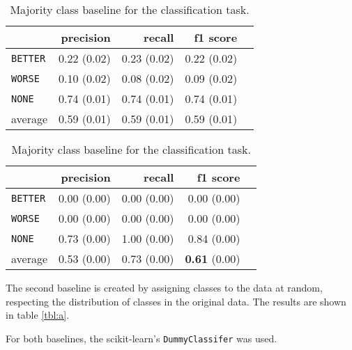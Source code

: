 \begin{table}[!htb]
    \begin{minipage}{.5\linewidth}
      \caption{Random (stratified) baseline for the classification task.}
      \label{foo}
      \centering
      
\begin{tabular}{@{}lrrrr@{}}
\toprule
 	&	 precision &	 recall &	 f1 score  \\ \midrule 
\texttt{BETTER}	&	 0.22 \scriptsize{(0.02)} &	 0.23 \scriptsize{(0.02)} &	 0.22 \scriptsize{(0.02)}  \\ 
\texttt{WORSE}	&	 0.10 \scriptsize{(0.02)} &	 0.08 \scriptsize{(0.02)} &	 0.09 \scriptsize{(0.02)}  \\ 
\texttt{NONE}	&	 0.74 \scriptsize{(0.01)} &	 0.74 \scriptsize{(0.01)} &	 0.74 \scriptsize{(0.01)}  \\ 
average	&	 0.59 \scriptsize{(0.01)} &	 0.59 \scriptsize{(0.01)} &	 0.59 \scriptsize{(0.01)}  \\ 
\bottomrule
\end{tabular} 

  \end{minipage}%
    \begin{minipage}{.5\linewidth}
      \centering
        \caption{Majority class baseline for the classification task.}
\begin{tabular}{@{}lrrrr@{}}
\toprule
 	&	 precision &	 recall &	 f1 score  \\ \midrule 
\texttt{BETTER}	&	 0.00 \scriptsize{(0.00)} &	 0.00 \scriptsize{(0.00)} &	 0.00 \scriptsize{(0.00)}  \\ 
\texttt{WORSE}	&	 0.00 \scriptsize{(0.00)} &	 0.00 \scriptsize{(0.00)} &	 0.00 \scriptsize{(0.00)}  \\ 
\texttt{NONE}	&	 0.73 \scriptsize{(0.00)} &	 1.00 \scriptsize{(0.00)} &	 0.84 \scriptsize{(0.00)}  \\ 
average	&	 0.53 \scriptsize{(0.00)} &	 0.73 \scriptsize{(0.00)} &	 \textbf{0.61} \scriptsize{(0.00)}  \\ 
\bottomrule
\end{tabular}
    \end{minipage} 
\end{table}



The second baseline is created by assigning classes to the data at random, respecting the distribution of classes in the original data. The results are shown in table \ref{tbl:a}.

For both baselines, the scikit-learn's \texttt{DummyClassifer} was used.



